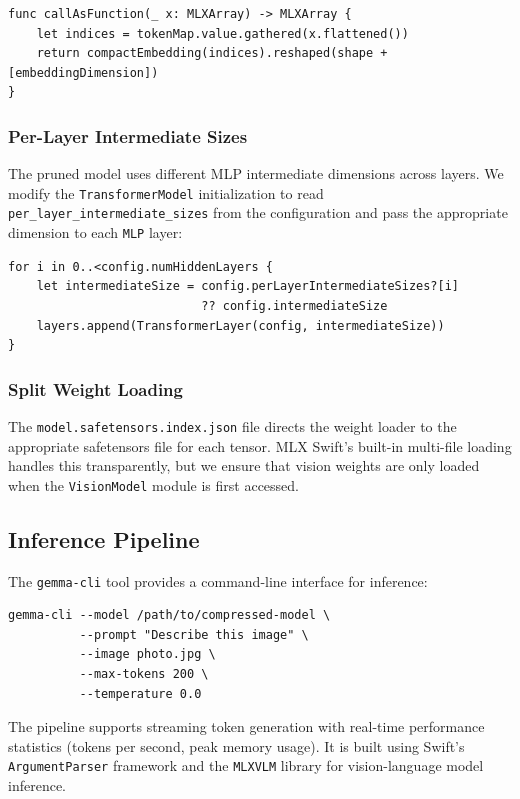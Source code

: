 \documentclass[11pt]{article}
\begin{document}
\begin{verbatim}
func callAsFunction(_ x: MLXArray) -> MLXArray {
    let indices = tokenMap.value.gathered(x.flattened())
    return compactEmbedding(indices).reshaped(shape + [embeddingDimension])
}
\end{verbatim}

\subsubsection{Per-Layer Intermediate Sizes}

The pruned model uses different MLP intermediate dimensions across layers. We modify the \texttt{TransformerModel} initialization to read \texttt{per\_layer\_intermediate\_sizes} from the configuration and pass the appropriate dimension to each \texttt{MLP} layer:

\begin{verbatim}
for i in 0..<config.numHiddenLayers {
    let intermediateSize = config.perLayerIntermediateSizes?[i]
                           ?? config.intermediateSize
    layers.append(TransformerLayer(config, intermediateSize))
}
\end{verbatim}

\subsubsection{Split Weight Loading}

The \texttt{model.safetensors.index.json} file directs the weight loader to the appropriate safetensors file for each tensor. MLX Swift's built-in multi-file loading handles this transparently, but we ensure that vision weights are only loaded when the \texttt{VisionModel} module is first accessed.

\subsection{Inference Pipeline}

The \texttt{gemma-cli} tool provides a command-line interface for inference:

\begin{verbatim}
gemma-cli --model /path/to/compressed-model \
          --prompt "Describe this image" \
          --image photo.jpg \
          --max-tokens 200 \
          --temperature 0.0
\end{verbatim}

The pipeline supports streaming token generation with real-time performance statistics (tokens per second, peak memory usage). It is built using Swift's \texttt{ArgumentParser} framework and the \texttt{MLXVLM} library for vision-language model inference.
\end{document}
